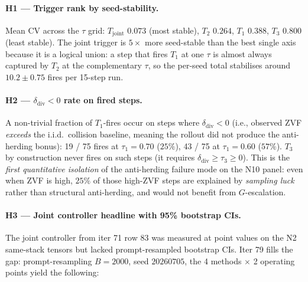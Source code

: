 \paragraph{H1 --- Trigger rank by seed-stability.}
Mean CV across the $\tau$ grid: $T_{\mathrm{joint}}$ $0.073$
(most stable), $T_2$ $0.264$, $T_1$ $0.388$, $T_3$ $0.800$ (least
stable).  The joint trigger is $5\times$ more seed-stable than the
best single axis because it is a logical union: a step that fires
$T_1$ at one $\tau$ is almost always captured by $T_2$ at the
complementary $\tau$, so the per-seed total stabilises around
$10.2 \pm 0.75$ fires per 15-step run.

\paragraph{H2 --- $\delta_{\mathrm{div}}{<}0$ rate on fired steps.}
A non-trivial fraction of $T_1$-fires occur on steps where
$\delta_{\mathrm{div}}{<}0$ (i.e., observed ZVF \emph{exceeds} the
i.i.d.\ collision baseline, meaning the rollout did not produce the
anti-herding bonus): 19 / 75 fires at $\tau_1{=}0.70$
($25\%$), 43 / 75 at $\tau_1{=}0.60$ ($57\%$).  $T_3$ by
construction never fires on such steps (it requires
$\delta_{\mathrm{div}} \geq \tau_3 \geq 0$).  This is the
\emph{first quantitative isolation} of the anti-herding failure mode
on the N10 panel: even when ZVF is high, $25\%$ of those
high-ZVF steps are explained by \emph{sampling luck} rather than
structural anti-herding, and would not benefit from $G$-escalation.

\paragraph{H3 --- Joint controller headline with 95\% bootstrap CIs.}
The joint controller from iter 71 row 83 was measured at point values
on the N2 same-stack tensors but lacked prompt-resampled bootstrap
CIs.  Iter 79 fills the gap: prompt-resampling $B{=}2000$,
seed $20260705$, the 4 methods $\times$ 2 operating points yield the
following:

